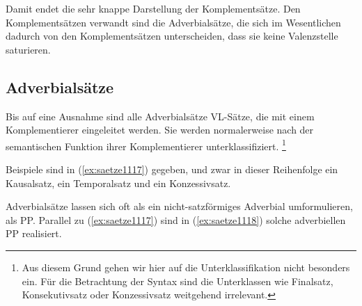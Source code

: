 Damit endet die sehr knappe Darstellung der Komplementsätze.
Den Komplementsätzen verwandt sind die Adverbialsätze, die sich im Wesentlichen dadurch von den Komplementsätzen unterscheiden, dass sie keine Valenzstelle saturieren.

\subsection{Adverbialsätze}

\label{sec:adverbialsaetze}

Bis auf eine Ausnahme sind alle Adverbialsätze VL-Sätze, die mit einem Komplementierer eingeleitet werden.
Sie werden normalerweise nach der semantischen Funktion ihrer Komplementierer unterklassifiziert.%
\footnote{Aus diesem Grund gehen wir hier auf die Unterklassifikation nicht besonders ein.
Für die Betrachtung der Syntax sind die Unterklassen wie Finalsatz, Konsekutivsatz oder Konzessivsatz weitgehend irrelevant.}


Beispiele sind in (\ref{ex:saetze1117}) gegeben, und zwar in dieser Reihenfolge ein Kausalsatz, ein Temporalsatz und ein Konzessivsatz.

\begin{exe}
  \ex\label{ex:saetze1117}
  \begin{xlist}
  \end{xlist}
\end{exe}

Adverbialsätze lassen sich oft als ein nicht-satzförmiges Adverbial umformulieren, \zB als PP.
Parallel zu (\ref{ex:saetze1117}) sind in (\ref{ex:saetze1118}) solche adverbiellen PP realisiert.

\begin{exe}
  \ex\label{ex:saetze1118}
  \begin{xlist}
  \end{xlist}
\end{exe}

